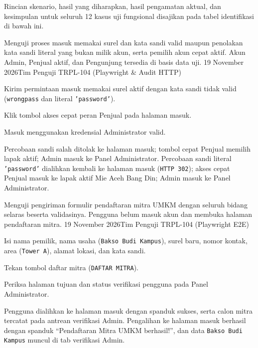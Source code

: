 Rincian skenario, hasil yang diharapkan, hasil pengamatan aktual, dan kesimpulan untuk seluruh 12 kasus uji fungsional disajikan pada tabel identifikasi di bawah ini.

{Menguji proses masuk memakai surel dan kata sandi valid maupun penolakan kata sandi literal yang bukan milik akun, serta pemilih akun cepat aktif.}
{Akun Admin, Penjual aktif, dan Pengunjung tersedia di basis data uji.}
{19 November 2026}{Tim Penguji TRPL-104 (Playwright \& Audit HTTP)}
{\begin{uclist}
  \item Kirim permintaan masuk memakai surel aktif dengan kata sandi tidak valid (\texttt{wrongpass} dan literal \texttt{'password'}).
  \item Klik tombol akses cepat peran Penjual pada halaman masuk.
  \item Masuk menggunakan kredensial Administrator valid.
\end{uclist}}
{Percobaan sandi salah ditolak ke halaman masuk; tombol cepat Penjual memilih lapak aktif; Admin masuk ke Panel Administrator.}
{Percobaan sandi literal \texttt{'password'} dialihkan kembali ke halaman masuk (\texttt{HTTP 302}); akses cepat Penjual masuk ke lapak aktif Mie Aceh Bang Din; Admin masuk ke Panel Administrator.}

{Menguji pengiriman formulir pendaftaran mitra UMKM dengan seluruh bidang selaras beserta validasinya.}
{Pengguna belum masuk akun dan membuka halaman pendaftaran mitra.}
{19 November 2026}{Tim Penguji TRPL-104 (Playwright E2E)}
{\begin{uclist}
  \item Isi nama pemilik, nama usaha (\texttt{Bakso Budi Kampus}), surel baru, nomor kontak, area (\texttt{Tower A}), alamat lokasi, dan kata sandi.
  \item Tekan tombol daftar mitra (\texttt{DAFTAR MITRA}).
  \item Periksa halaman tujuan dan status verifikasi pengguna pada Panel Administrator.
\end{uclist}}
{Pengguna dialihkan ke halaman masuk dengan spanduk sukses, serta calon mitra tercatat pada antrean verifikasi Admin.}
{Pengalihan ke halaman masuk berhasil dengan spanduk ``Pendaftaran Mitra UMKM berhasil!'', dan data \texttt{Bakso Budi Kampus} muncul di tab verifikasi Admin.}

